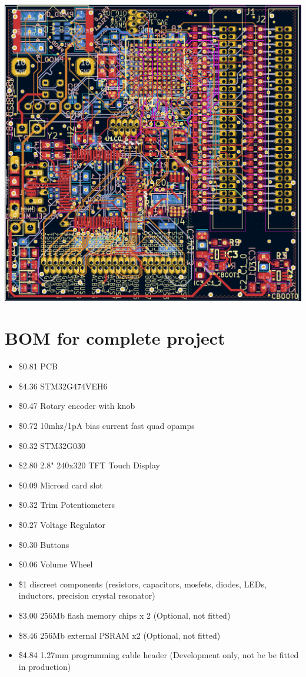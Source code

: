 \includegraphics{ezusb}

\section{BOM for complete project}
\begin{itemize}
	\item \$0.81 PCB
	\item \$4.36 STM32G474VEH6
	\item \$0.47 Rotary encoder with knob
	\item \$0.72 10mhz/1pA bias current fast quad opamps
	\item \$0.32 STM32G030
	\item \$2.80 2.8" 240x320 TFT Touch Display
	\item \$0.09 Microsd card slot
	\item \$0.32 Trim Potentiometers
	\item \$0.27 Voltage Regulator
	\item \$0.30 Buttons
	\item \$0.06 Volume Wheel
	\item \~\$1 discreet components (resistors, capacitors, mosfets, diodes, LEDs, inductors, precision crystal resonator)
	\item \$3.00 256Mb flash memory chips x 2 (Optional, not fitted)
	\item \$8.46 256Mb external PSRAM x2 (Optional, not fitted)
	\item \$4.84 1.27mm programming cable header (Development only, not be be fitted in production)
\end{itemize}

